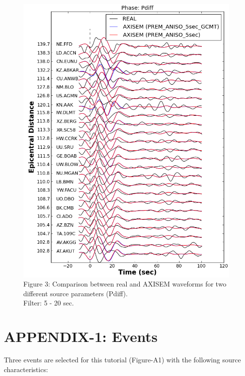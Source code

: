 \documentclass{article}
\begin{document}
\begin{figure}[H]
\begin{minipage}{.5\textwidth}
        \includegraphics[width=0.9\linewidth]{AXISEMTutorial-fig014.png}
        {\small{}Figure 3: Comparison between real and AXISEM waveforms for two different
        source parameters (Pdiff). \\ Filter: 5 - 20 sec.}
    \end{minipage}
\end{figure}


\newpage
\appendix
\section{APPENDIX-1: Events}

Three events are selected for this tutorial (Figure-A1) with the following source
characteristics:
\end{document}
